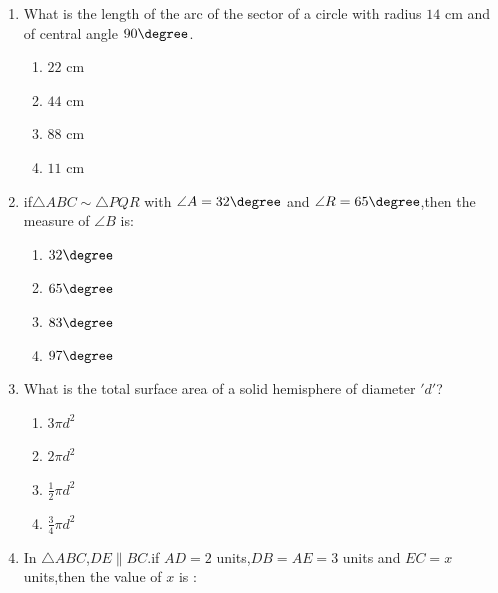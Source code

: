 %
\begin{enumerate}
    \item What is the length of the arc of the sector of a circle with radius $14$ cm and of central angle $90\degree$.
    \begin{enumerate}
        \item $22$ cm
        \item $44$ cm
        \item $88$ cm
        \item $11$ cm
    \end{enumerate}
    \item if$\triangle ABC \sim \triangle PQR$ with $\angle A=32\degree$ and $\angle R=65\degree$,then the measure of $\angle B$ is:
    \begin{enumerate}
        \item $32\degree$
        \item $65\degree$
        \item $83\degree$
        \item $97\degree$
    \end{enumerate}
    \item What is the total surface area of a solid hemisphere of diameter $'d'$?
    \begin{enumerate}
        \item $3 \pi d^2$
        \item $2 \pi d^2$
        \item $\frac{1}{2} \pi d^2$
        \item $\frac{3}{4} \pi d^2$
    \end{enumerate}
    \item In $\triangle ABC$,$DE \parallel BC$.if $AD=2$ units,$DB=AE=3$ units and $EC=x$ units,then the value of $x$ is :
    \begin{figure}[!ht]
        \centering

\end{figure}
\end{enumerate}
